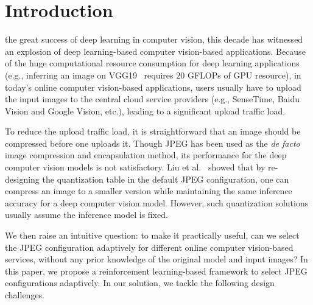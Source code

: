 \section{Introduction}
\label{sec: introduction}

 the great success of deep learning in computer vision, this decade has witnessed an explosion of deep learning-based computer vision-based applications. Because of the huge computational resource consumption for deep learning applications (e.g., inferring an image on VGG19~\cite{VGG19} requires $20$ GFLOPs of GPU resource), in today's online computer vision-based applications, users usually have to upload the input images to the central cloud service providers (e.g., SenseTime, Baidu Vision and Google Vision, etc.), leading to a significant upload traffic load. 

To reduce the upload traffic load, it is straightforward that an image should be compressed before one uploads it. Though JPEG has been used as the \emph{de facto} image compression and encapsulation method, its performance for the deep computer vision models is not satisfactory. Liu et al.~\cite{DeepN-JPEG} showed that by re-designing the quantization table in the default JPEG configuration, one can compress an image to a smaller version while maintaining the same inference accuracy for a deep computer vision model. However, such quantization solutions usually assume the inference model is fixed. 

We then raise an intuitive question: to make it practically useful, can we select the JPEG configuration adaptively for different online computer vision-based services, without any prior knowledge of the original model and input images? In this paper, we propose a reinforcement learning-based framework to select JPEG configurations adaptively. In our solution, we tackle the following design challenges.


